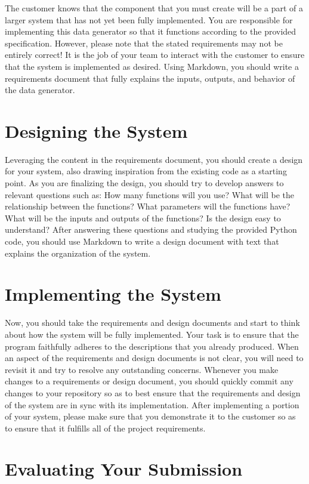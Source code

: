\documentclass[11pt]{article}
\begin{document}
The customer knows that the component that you must create will be a part of a larger system that has not yet been
fully implemented. You are responsible for implementing this data generator so that it functions according to the
provided specification. However, please note that the stated requirements may not be entirely correct! It is the job
of your team to interact with the customer to ensure that the system is implemented as desired. Using Markdown, you
should write a requirements document that fully explains the inputs, outputs, and behavior of the data generator.

\section*{Designing the System}

Leveraging the content in the requirements document, you should create a design for your system, also drawing
inspiration from the existing code as a starting point. As you are finalizing the design, you should try to develop
answers to relevant questions such as: How many functions will you use? What will be the relationship between the
functions? What parameters will the functions have? What will be the inputs and outputs of the functions? Is the design
easy to understand? After answering these questions and studying the provided Python code, you should use Markdown to
write a design document with text that explains the organization of the system.

\section*{Implementing the System}

Now, you should take the requirements and design documents and start to think about how the system will be fully
implemented. Your task is to ensure that the program faithfully adheres to the descriptions that you already produced.
When an aspect of the requirements and design documents is not clear, you will need to revisit it and try to resolve any
outstanding concerns. Whenever you make changes to a requirements or design document, you should quickly commit any
changes to your repository so as to best ensure that the requirements and design of the system are in sync with its
implementation. After implementing a portion of your system, please make sure that you demonstrate it to the customer so
as to ensure that it fulfills all of the project requirements.

\section*{Evaluating Your Submission}
\end{document}
